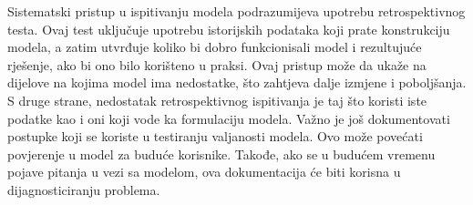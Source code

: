 \documentclass[a4paper, utf8, 11pt, colorlinks]{book}
\begin{document}
Sistematski pristup u ispitivanju modela podrazumijeva upotrebu retrospektivnog testa. Ovaj test uključuje upotrebu istorijskih podataka koji prate konstrukciju modela, a zatim utvrđuje koliko bi dobro funkcionisali model i rezultujuće rješenje, ako bi ono  bilo korišteno u praksi.  Ovaj pristup može da ukaže na dijelove na kojima model ima nedostatke, što zahtjeva dalje izmjene i poboljšanja. 
S druge strane, nedostatak retrospektivnog ispitivanja je taj što koristi iste podatke kao i oni koji vode ka formulaciju modela. %
Važno je još dokumentovati postupke koji se koriste u testiranju valjanosti modela. Ovo može  povećati povjerenje u model za buduće korisnike. Takođe, ako se u budućem vremenu pojave pitanja u vezi sa modelom, ova dokumentacija će  biti korisna u dijagnosticiranju problema. 

\end{document}
